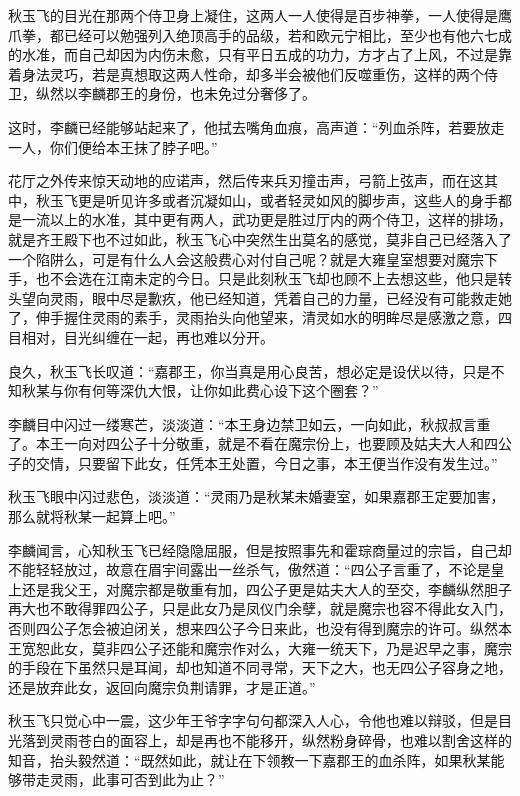 秋玉飞的目光在那两个侍卫身上凝住，这两人一人使得是百步神拳，一人使得是鹰爪拳，都已经可以勉强列入绝顶高手的品级，若和欧元宁相比，至少也有他六七成的水准，而自己却因为内伤未愈，只有平日五成的功力，方才占了上风，不过是靠着身法灵巧，若是真想取这两人性命，却多半会被他们反噬重伤，这样的两个侍卫，纵然以李麟郡王的身份，也未免过分奢侈了。

这时，李麟已经能够站起来了，他拭去嘴角血痕，高声道：“列血杀阵，若要放走一人，你们便给本王抹了脖子吧。”

花厅之外传来惊天动地的应诺声，然后传来兵刃撞击声，弓箭上弦声，而在这其中，秋玉飞更是听见许多或者沉凝如山，或者轻灵如风的脚步声，这些人的身手都是一流以上的水准，其中更有两人，武功更是胜过厅内的两个侍卫，这样的排场，就是齐王殿下也不过如此，秋玉飞心中突然生出莫名的感觉，莫非自己已经落入了一个陷阱么，可是有什么人会这般费心对付自己呢？就是大雍皇室想要对魔宗下手，也不会选在江南未定的今日。只是此刻秋玉飞却也顾不上去想这些，他只是转头望向灵雨，眼中尽是歉疚，他已经知道，凭着自己的力量，已经没有可能救走她了，伸手握住灵雨的素手，灵雨抬头向他望来，清灵如水的明眸尽是感激之意，四目相对，目光纠缠在一起，再也难以分开。

良久，秋玉飞长叹道：“嘉郡王，你当真是用心良苦，想必定是设伏以待，只是不知秋某与你有何等深仇大恨，让你如此费心设下这个圈套？”

李麟目中闪过一缕寒芒，淡淡道：“本王身边禁卫如云，一向如此，秋叔叔言重了。本王一向对四公子十分敬重，就是不看在魔宗份上，也要顾及姑夫大人和四公子的交情，只要留下此女，任凭本王处置，今日之事，本王便当作没有发生过。”

秋玉飞眼中闪过悲色，淡淡道：“灵雨乃是秋某未婚妻室，如果嘉郡王定要加害，那么就将秋某一起算上吧。”

李麟闻言，心知秋玉飞已经隐隐屈服，但是按照事先和霍琮商量过的宗旨，自己却不能轻轻放过，故意在眉宇间露出一丝杀气，傲然道：“四公子言重了，不论是皇上还是我父王，对魔宗都是敬重有加，四公子更是姑夫大人的至交，李麟纵然胆子再大也不敢得罪四公子，只是此女乃是凤仪门余孽，就是魔宗也容不得此女入门，否则四公子怎会被迫闭关，想来四公子今日来此，也没有得到魔宗的许可。纵然本王宽恕此女，莫非四公子还能和魔宗作对么，大雍一统天下，乃是迟早之事，魔宗的手段在下虽然只是耳闻，却也知道不同寻常，天下之大，也无四公子容身之地，还是放弃此女，返回向魔宗负荆请罪，才是正道。”

秋玉飞只觉心中一震，这少年王爷字字句句都深入人心，令他也难以辩驳，但是目光落到灵雨苍白的面容上，却是再也不能移开，纵然粉身碎骨，也难以割舍这样的知音，抬头毅然道：“既然如此，就让在下领教一下嘉郡王的血杀阵，如果秋某能够带走灵雨，此事可否到此为止？”


